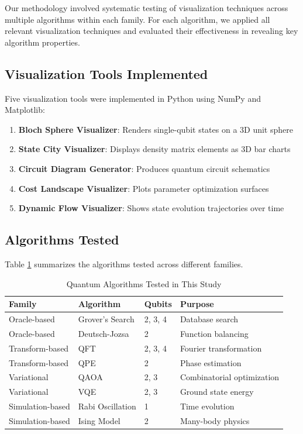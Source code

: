 \documentclass[12pt,a4paper]{article}
\begin{document}
Our methodology involved systematic testing of visualization techniques across multiple algorithms within each family. For each algorithm, we applied all relevant visualization techniques and evaluated their effectiveness in revealing key algorithm properties.

\subsection{Visualization Tools Implemented}

Five visualization tools were implemented in Python using NumPy and Matplotlib:

\begin{enumerate}
	\item \textbf{Bloch Sphere Visualizer}: Renders single-qubit states on a 3D unit sphere
	\item \textbf{State City Visualizer}: Displays density matrix elements as 3D bar charts
	\item \textbf{Circuit Diagram Generator}: Produces quantum circuit schematics
	\item \textbf{Cost Landscape Visualizer}: Plots parameter optimization surfaces
	\item \textbf{Dynamic Flow Visualizer}: Shows state evolution trajectories over time
\end{enumerate}

\subsection{Algorithms Tested}

Table \ref{tab:algorithms} summarizes the algorithms tested across different families.

\begin{table}[h!]
	\centering
	\caption{Quantum Algorithms Tested in This Study}
	\label{tab:algorithms}
	\begin{tabular}{@{}llll@{}}
		\toprule
		\textbf{Family}  & \textbf{Algorithm} & \textbf{Qubits} & \textbf{Purpose}           \\ \midrule
		Oracle-based     & Grover's Search    & 2, 3, 4         & Database search            \\
		Oracle-based     & Deutsch-Jozsa      & 2               & Function balancing         \\
		Transform-based  & QFT                & 2, 3, 4         & Fourier transformation     \\
		Transform-based  & QPE                & 2               & Phase estimation           \\
		Variational      & QAOA               & 2, 3            & Combinatorial optimization \\
		Variational      & VQE                & 2, 3            & Ground state energy        \\
		Simulation-based & Rabi Oscillation   & 1               & Time evolution             \\
		Simulation-based & Ising Model        & 2               & Many-body physics          \\ \bottomrule
	\end{tabular}
\end{table}
\end{document}
